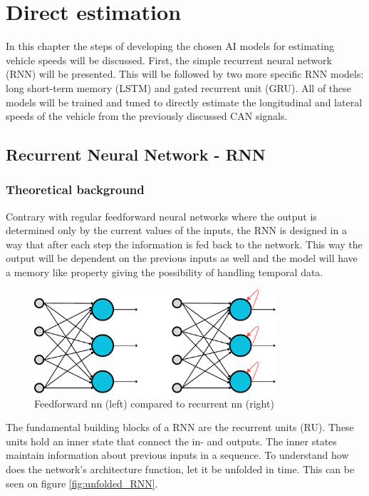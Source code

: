 \chapter{Direct estimation}

In this chapter the steps of developing the chosen AI models for estimating vehicle speeds will be discussed. First, the simple recurrent neural network (RNN) will be presented. This will be followed by two more specific RNN models: long short-term memory (LSTM) and gated recurrent unit (GRU). All of these models will be trained and tuned to directly estimate the longitudinal and lateral speeds of the vehicle from the previously discussed CAN signals.

\section{Recurrent Neural Network - RNN}

\subsection{Theoretical background}

Contrary with regular feedforward neural networks where the output is determined only by the current values of the inputs, the RNN is designed in a way that after each step the information is fed back to the network. This way the output will be dependent on the previous inputs as well and the model will have a memory like property giving the possibility of handling temporal data.

\FloatBarrier
\begin{figure}[h]
    \centering
    \includegraphics[width=0.8\textwidth]{images/feedforward vs recurrent.pdf}
    \caption{Feedforward nn (left) compared to recurrent nn (right)}
    \label{fig:NNvsRNN}
\end{figure}
\FloatBarrier

The fundamental building blocks of a RNN are the recurrent units (RU). These units hold an inner state that connect the in- and outputs. The inner states maintain information about previous inputs in a sequence. To understand how does the network's architecture function, let it be unfolded in time. This can be seen on figure \ref{fig:unfolded_RNN}.


